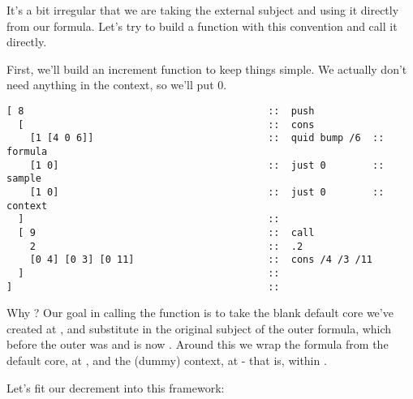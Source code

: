It's a bit irregular that we are taking the external subject
and using it directly from our formula.  Let's try to build a
function with this convention and call it directly.

First, we'll build an increment function to keep things simple.
We actually don't need anything in the context, so we'll put 0.

\begin{framed_shaded}
\begin{Verbatim}[fontsize=\relsize{-2.5},commandchars=\\\{\}]
[ 8                                          ::  push
  [                                          ::  cons
    [1 [4 0 6]]                              ::  quid bump /6  ::  formula
    [1 0]                                    ::  just 0        ::  sample
    [1 0]                                    ::  just 0        ::  context
  ]                                          ::  
  [ 9                                        ::  call
    2                                        ::  .2
    [0 4] [0 3] [0 11]                       ::  cons /4 /3 /11
  ]                                          ::  
]                                            ::
\end{Verbatim}
\end{framed_shaded}
Why \kode{[[0 4] [0 3] [0 11]]}?  Our goal in calling the function is
to take the blank default core we've created at , and
substitute in the original subject of the outer formula, which
before the outer  was  and is now .  Around this
we wrap the formula from the default core, at , and the
(dummy) context, at  - that is,  within .

Let's fit our decrement into this framework:

